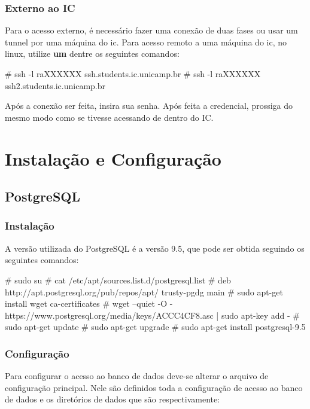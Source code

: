 \documentclass[a4paper,10pt]{article}
\begin{document}
        \subsubsection{Externo ao IC}
        Para o acesso externo, é necessário fazer uma conexão de duas fases ou usar um tunnel por uma máquina do ic. Para acesso remoto a uma máquina do ic, no linux, utilize \textbf{um} dentre os seguintes comandos:
        \begin{spverbatim}
        # ssh -l raXXXXXX ssh.students.ic.unicamp.br
        # ssh -l raXXXXXX ssh2.students.ic.unicamp.br
        \end{spverbatim}

        Após a conexão ser feita, insira sua senha. Após feita a credencial, prossiga do mesmo modo como se tivesse acessando de dentro do IC.

\section{Instalação e Configuração}
    \subsection{PostgreSQL}
        \subsubsection{Instalação}
        A versão utilizada do PostgreSQL é a versão 9.5, que pode ser obtida seguindo os seguintes comandos:
        \begin{spverbatim}
        # sudo su
        # cat /etc/apt/sources.list.d/postgresql.list
        # deb http://apt.postgresql.org/pub/repos/apt/ trusty-pgdg main
        # sudo apt-get install wget ca-certificates
        # wget --quiet -O - https://www.postgresql.org/media/keys/ACCC4CF8.asc | sudo apt-key add -
        # sudo apt-get update
        # sudo apt-get upgrade
        # sudo apt-get install postgresql-9.5

        \end{spverbatim}

        \subsubsection{Configuração}
        Para configurar o acesso ao banco de dados deve-se alterar o arquivo de configuração principal. Nele são definidos toda a configuração de acesso ao banco de dados e os diretórios de dados que são respectivamente:
\end{document}
